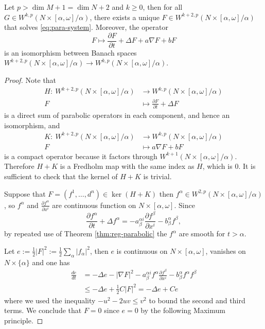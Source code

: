 \begin{theorem}
\label{thm:lin-heat}
Let \(p > \dim M+1 = \dim N+2\) and \(k\geq 0\), then for all \(G\in
W^{k,p}(N\times[\alpha,\omega]/\alpha)\), there exists a unique \(F\in
W^{k+2,p}(N\times [\alpha,\omega]/\alpha)\) that solves
\eqref{eq:para-system}. Moreover, the operator 
\[ 
F\longmapsto \frac{\partial F}{\partial t} + \Delta F +
a\nabla F + b F
\]
is an isomorphism between Banach spaces \(W^{k+2,p}(N\times[\alpha,\omega]/\alpha) \longrightarrow
W^{k,p}(N\times[\alpha,\omega]/\alpha)\).
\end{theorem}
\begin{proof}
Note that
\begin{align*}
H:\  W^{k+2,p}(N\times[\alpha,\omega]/\alpha) &\longrightarrow W^{k,p}(N\times[\alpha,\omega]/\alpha)\\
     F					      &\longmapsto      \frac{\partial F}{\partial t} + \Delta F
\end{align*}
is a direct sum of parabolic operators in each component, and hence an isomorphism, and 
\begin{align*}
K:\  W^{k+2,p}(N\times[\alpha,\omega]/\alpha) &\longrightarrow W^{k,p}(N\times[\alpha,\omega]/\alpha)\\
     F					      &\longmapsto      a\nabla F + bF
\end{align*}
is a compact operator because it factors through \(W^{k+1}(N\times
[\alpha,\omega]/\alpha)\). Therefore \(H+K\) is a Fredholm map with the same index as \(H\), which is \(0\). It is sufficient to check that the kernel of \(H+K\) is
trivial.

Suppose that \(F = (f^1,\dots, d^n)\in \ker (H+K)\) then \(f^\alpha\in W^{2,p}(N\times
[\alpha,\omega]/\alpha)\), so \(f^\alpha\) and \(\frac{\partial f^\alpha}{\partial
x^i}\) are continuous function on \(N\times[\alpha,\omega]\). Since
\[
 \frac{\partial f^\alpha}{\partial t} + \Delta f^\alpha = -a^{\alpha i}_\beta
\frac{\partial f^\beta}{\partial x^i} - b^\alpha_\beta f^\beta,
\]
by repeated use of Theorem \ref{thm:reg-parabolic} the \(f^\alpha\) are smooth for \(t>\alpha\).

Let \(e:= \frac{1}{2}|F|^2 := \frac{1}{2}\sum_\alpha |f_\alpha|^2\), then \(e\) is
continuous on \(N\times [\alpha,\omega]\), vanishes on \(N\times \{\alpha\}\) and one has
\begin{align*}
 \frac{d e}{dt} &= -\Delta e - |\nabla F|^2 - a^{\alpha i}_\beta f^\alpha \frac{\partial f^\beta}{\partial x^i} - b^\alpha_\beta f^\alpha f^\beta  \\
 	 	&\leq -\Delta e + \frac{1}{2} C |F|^2 = -\Delta e + Ce
\end{align*}
where we used the inequality \(-u^2 - 2uv \leq v^2\) to bound the second and third
terms. We conclude that \(F=0\) since \(e= 0\) by the following Maximum principle. 
\end{proof}

